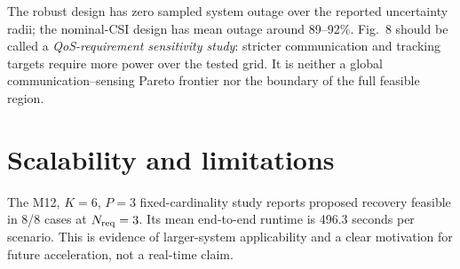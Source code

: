The robust design has zero sampled system outage over the reported uncertainty
radii; the nominal-CSI design has mean outage around 89--92\%. Fig.~8 should be
called a \emph{QoS-requirement sensitivity study}: stricter communication and
tracking targets require more power over the tested grid. It is neither a
global communication--sensing Pareto frontier nor the boundary of the full
feasible region.

\section{Scalability and limitations}
The M12, $K=6$, $P=3$ fixed-cardinality study reports proposed recovery feasible
in 8/8 cases at $N_{\rm req}=3$. Its mean end-to-end runtime is 496.3 seconds
per scenario. This is evidence of larger-system applicability and a clear
motivation for future acceleration, not a real-time claim.

